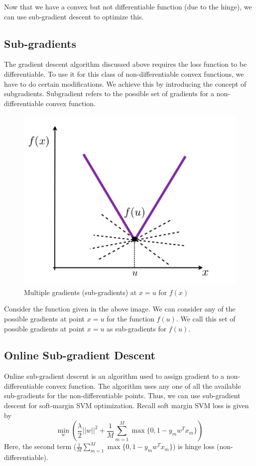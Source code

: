 \documentclass[11pt]{article}
\begin{document}
	
	Now that we have a convex but not differentiable function (due to the hinge), we can use sub-gradient descent to optimize this. 
\subsection{Sub-gradients}
The gradient descent algorithm discussed above requires the loss function to be differentiable. To use it for this class of non-differentiable convex functions, we have to do certain modifications. We achieve this by introducing the concept of subgradients. Subgradient refers to the possible set of gradients for a non-differentiable convex function. 
    \begin{figure}[h!]
    \centering
    \includegraphics[scale=0.3]{images/sub_gradients.png}
    \caption{Multiple gradients (sub-gradients) at $x=u$ for $f(x)$}
    \end{figure}
\newline Consider the function given in the above image. We can consider any of the possible gradients at point $x=u$ for the function $f(u)$. We call this set of possible gradients at point $x=u$ as sub-gradients for $f(u)$.
\subsection{Online Sub-gradient Descent}
Online sub-gradient descent is an algorithm used to assign gradient to a non-differentiable convex function. The algorithm uses any one of all the available sub-gradients for the non-differentiable points. Thus, we can use sub-gradient descent for soft-margin SVM optimization.
\newline Recall soft margin SVM loss is given by
\[ \min_w \left(\frac{\lambda}{2}||w||^2 + \frac{1}{M} \sum_{m=1}^{M} \max \{0,1 - y_mw^Tx_m\} \right) \]
Here, the second term ($\frac{1}{M} \sum_{m=1}^{M} \max \{0,1 - y_mw^Tx_m\}$) is hinge loss (non-differentiable). 
\end{document}
